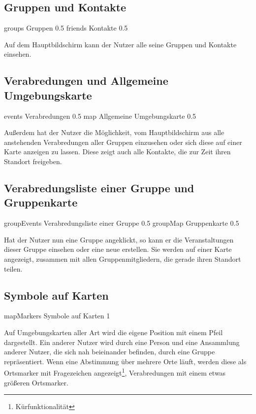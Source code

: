 \documentclass[parskip=full,11pt]{scrartcl}
\begin{document}
\pagebreak
\subsection{Gruppen und Kontakte}
{groups}
{Gruppen}
{0.5}
{friends}
{Kontakte}
{0.5}

Auf dem Hauptbildschirm kann der Nutzer alle seine Gruppen und Kontakte einsehen.

\pagebreak
\subsection{Verabredungen und Allgemeine Umgebungskarte}
{events}
{Verabredungen}
{0.5}
{map}
{Allgemeine Umgebungskarte}
{0.5}

Außerdem hat der Nutzer die Möglichkeit, vom Hauptbildschirm aus alle anstehenden Verabredungen aller Gruppen einzusehen oder sich diese auf einer Karte anzeigen zu lassen. 
Diese zeigt auch alle Kontakte, die zur Zeit ihren Standort freigeben.

\pagebreak
\subsection{Verabredungsliste einer Gruppe und Gruppenkarte}
{groupEvents}
{Verabredungsliste einer Gruppe}
{0.5}
{groupMap}
{Gruppenkarte}
{0.5}

Hat der Nutzer nun eine Gruppe angeklickt, so kann er die Veranstaltungen dieser Gruppe einsehen oder eine neue erstellen.
Sie werden auf einer Karte angezeigt, zusammen mit allen Gruppenmitgliedern, die gerade ihren Standort teilen.

\subsection{Symbole auf Karten}
{mapMarkers}
{Symbole auf Karten}
{1}

Auf Umgebungskarten aller Art wird die eigene Position mit einem Pfeil dargestellt. 
Ein anderer Nutzer wird durch eine Person und eine Ansammlung anderer Nutzer, die sich nah beieinander befinden, durch eine Gruppe repräsentiert.
Wenn eine Abstimmung über mehrere Orte läuft, werden diese als Ortsmarker mit Fragezeichen angezeigt\footnote[1]{Kürfunktionalität}, Verabredungen mit einem etwas größeren Ortsmarker.
\end{document}
